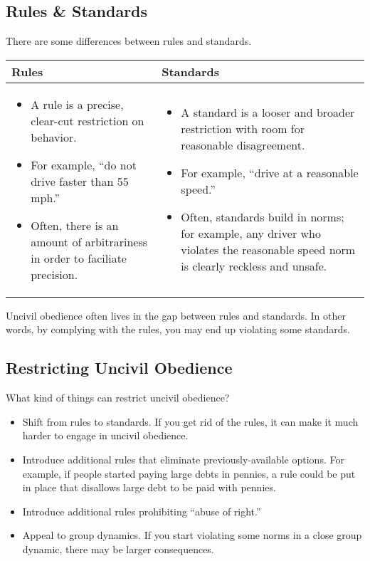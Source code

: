 \documentclass[letterpaper]{article}
\begin{document}
\subsection{Rules \& Standards}
There are some differences between rules and standards. 
\begin{center}
    \begin{tabular}{p{3in}|p{3in}}
        \textbf{Rules} & \textbf{Standards} \\ 
        \hline
        \begin{itemize}
            \item A rule is a precise, clear-cut restriction on behavior.
            \item For example, ``do not drive faster than 55 mph.''
            \item Often, there is an amount of arbitrariness in order to faciliate precision.
        \end{itemize} & \begin{itemize}
            \item A standard is a looser and broader restriction with room for reasonable disagreement. 
            \item For example, ``drive at a reasonable speed.''
            \item Often, standards build in norms; for example, any driver who violates the reasonable speed norm is clearly reckless and unsafe. 
        \end{itemize}
    \end{tabular}
\end{center}
Uncivil obedience often lives in the gap between rules and standards. In other words, by complying with the rules, you may end up violating some standards. 

\subsection{Restricting Uncivil Obedience}
What kind of things can restrict uncivil obedience?
\begin{itemize}
    \item Shift from rules to standards. If you get rid of the rules, it can make it much harder to engage in uncivil obedience.
    \item Introduce additional rules that eliminate previously-available options. For example, if people started paying large debts in pennies, a rule could be put in place that disallows large debt to be paid with pennies. 
    \item Introduce additional rules prohibiting ``abuse of right.''
    \item Appeal to group dynamics. If you start violating some norms in a close group dynamic, there may be larger consequences. 
\end{itemize}
\end{document}
